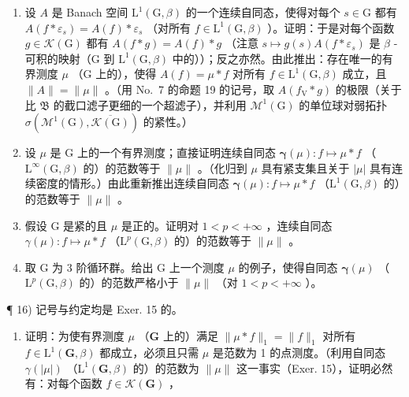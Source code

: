 \begin{enumerate}
\def\labelenumi{\alph{enumi})}
\item
  设 \(A\) 是 Banach 空间 \(\mathrm{L}^1(\mathrm{G},\beta)\) 的一个连续自同态，使得对每个 \(s \in \mathrm{G}\) 都有 \(A(f*\varepsilon_s) = A(f)*\varepsilon_s\) （对所有 \(f \in \mathrm{L}^1(\mathrm{G},\beta)\) ）。证明：于是对每个函数 \(g \in \mathcal{K}(\mathrm{G})\) 都有 \(A(f*g) = A(f)*g\) （注意 \(s \mapsto g(s)A(f*\varepsilon_s)\) 是 \(\beta\) -可积的映射（\(\mathrm{G}\) 到 \(\mathrm{L}^1(\mathrm{G},\beta)\) 中的））；反之亦然。由此推出：存在唯一的有界测度 \(\mu\) （\(\mathrm{G}\) 上的），使得 \(A(f) = \mu *f\) 对所有 \(f \in \mathrm{L}^1(\mathrm{G},\beta)\) 成立，且 \(\| A\| = \| \mu \|\) 。（用 No.~7 的命题 19 的记号，取 \(A(f_{\mathrm{V}}*g)\) 的极限（关于比 \(\mathfrak{B}\) 的截口滤子更细的一个超滤子），并利用 \(\mathcal{M}^1(\mathrm{G})\) 的单位球对弱拓扑 \(\sigma (\mathcal{M}^1(\mathrm{G}),\overline{\mathcal{K}(\mathrm{G})})\) 的紧性。）
\item
  设 \(\mu\) 是 G 上的一个有界测度；直接证明连续自同态 \(\pmb{\gamma}(\mu): f \mapsto \mu * f\) （\(\mathrm{L}^{\infty}(\mathrm{G},\beta)\) 的）的范数等于 \(\| \mu \|\) 。（化归到 \(\mu\) 具有紧支集且关于 \(|\mu|\) 具有连续密度的情形。）由此重新推出连续自同态 \(\pmb{\gamma}(\mu): f \mapsto \mu * f\) （\(\mathrm{L}^{1}(\mathrm{G},\beta)\) 的）的范数等于 \(\| \mu \|\) 。
\item
  假设 G 是紧的且 \(\mu\) 是正的。证明对 \(1 < p < +\infty\) ，连续自同态 \(\gamma(\mu): f \mapsto \mu * f\) （\(\mathrm{L}^{p}(\mathrm{G}, \beta)\) 的）的范数等于 \(\|\mu\|\) 。
\item
  取 G 为 3 阶循环群。给出 G 上一个测度 \(\mu\) 的例子，使得自同态 \(\pmb{\gamma}(\mu)\) （\(\mathrm{L}^p (\mathrm{G},\beta)\) 的）的范数严格小于 \(\| \mu \|\) （对 \(1 < p < +\infty\) ）。
\end{enumerate}

¶ 16) 记号与约定均是 Exer. 15 的。

\begin{enumerate}
\def\labelenumi{\alph{enumi})}
\tightlist
\item
  证明：为使有界测度 \(\mu\) （\(\mathbf{G}\) 上的）满足 \(\| \mu * f \|_1 = \| f \|_1\) 对所有 \(f \in \mathrm{L}^1(\mathbf{G}, \beta)\) 都成立，必须且只需 \(\mu\) 是范数为 1 的点测度。（利用自同态 \(\gamma(|\mu|)\) （\(\mathrm{L}^1(\mathbf{G}, \beta)\) 的）的范数为 \(\| \mu \|\) 这一事实（Exer. 15），证明必然有：对每个函数 \(f \in \mathcal{K}(\mathbf{G})\) ，
\end{enumerate}

